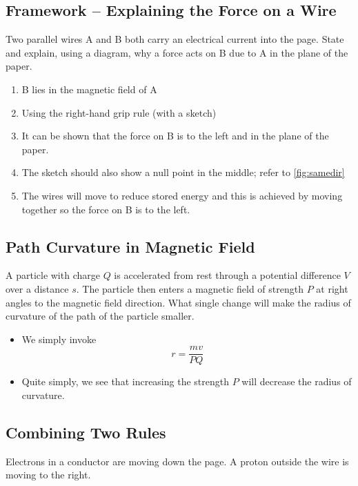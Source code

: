 \documentclass[a4paper,12pt]{article}
\begin{document}
\pagebreak

\subsection{Framework -- Explaining the Force on a Wire}
Two parallel wires A and B both carry an electrical current into the page. State and explain, using a diagram, why a force acts on B due to A in the plane of the paper.

\begin{enumerate}
  \item B lies in the magnetic field of A
  \item Using the right-hand grip rule (with a sketch)
  \item It can be shown that the force on B is to the left and in the plane of the paper.
  \item The sketch should also show a null point in the middle; refer to \cref{fig:samedir}
  \item The wires will move to reduce stored energy and this is achieved by moving together so the force on B is to the left.
\end{enumerate}

\pagebreak

\subsection{Path Curvature in Magnetic Field}

A particle with charge $Q$ is accelerated from rest through a potential difference $V$ over a distance $s$. The particle then enters a magnetic field of strength $P$ at right angles to the magnetic field direction. What single change will make the radius of curvature of the path of the particle smaller.

\begin{itemize}
  \item We simply invoke $$r = \frac{mv}{PQ}$$
  \item Quite simply, we see that increasing the strength $P$ will decrease the radius of curvature.
\end{itemize}

\pagebreak

\subsection{Combining Two Rules}

Electrons in a conductor are moving down the page. A proton outside the wire is moving to the right.
\end{document}
